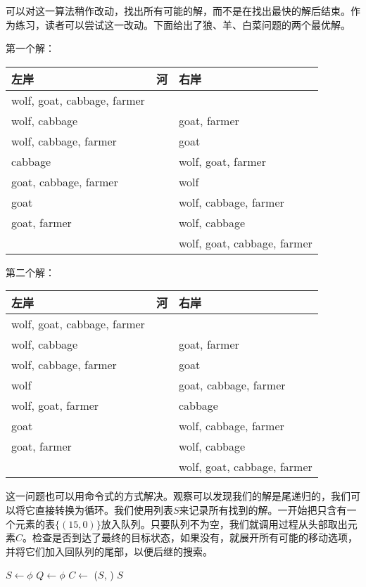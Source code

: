 \documentclass[UTF8]{article}
\begin{document}
可以对这一算法稍作改动，找出所有可能的解，而不是在找出最快的解后结束。作为练习，读者可以尝试这一改动。下面给出了狼、羊、白菜问题的两个最优解。

第一个解：

\begin{tabular}{l|c|l}
左岸 & 河 & 右岸 \\
\hline
wolf, goat, cabbage, farmer &   & \\
wolf, cabbage &   & goat, farmer \\
wolf, cabbage, farmer &   & goat \\
cabbage &   & wolf, goat, farmer \\
goat, cabbage, farmer &   & wolf \\
goat &   & wolf, cabbage, farmer \\
goat, farmer &   & wolf, cabbage \\
 &  & wolf, goat, cabbage, farmer
\end{tabular}

第二个解：

\begin{tabular}{l|c|l}
左岸 & 河 & 右岸 \\
\hline
 wolf, goat, cabbage, farmer & & \\
 wolf, cabbage & & goat, farmer \\
 wolf, cabbage, farmer & & goat \\
 wolf & & goat, cabbage, farmer \\
 wolf, goat, farmer & & cabbage \\
 goat & & wolf, cabbage, farmer \\
 goat, farmer & & wolf, cabbage \\
 & & wolf, goat, cabbage, farmer
\end{tabular}

这一问题也可以用命令式的方式解决。观察可以发现我们的解是尾递归的，我们可以将它直接转换为循环。我们使用列表$S$来记录所有找到的解。一开始把只含有一个元素的表$\{(15, 0)\}$放入队列。只要队列不为空，我们就调用过程从头部取出元素$C$。检查是否到达了最终的目标状态，如果没有，就展开所有可能的移动选项，并将它们加入回队列的尾部，以便后继的搜索。

\begin{algorithmic}[1]
  \State $S \gets \phi$
  \State $Q \gets \phi$
  \State {}
    \State $C \gets $ 
      \State {}($S$, )
    \Else
          \State {}
        \EndIf
      \EndFor
    \EndIf
  \EndWhile
  \State \Return $S$
\EndFunction
\end{algorithmic}
\end{document}
